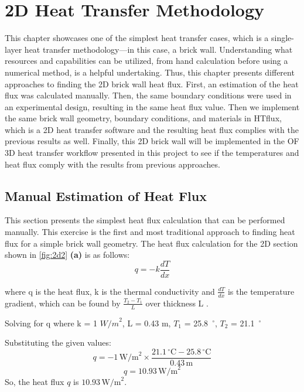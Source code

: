 
\chapter{2D Heat Transfer Methodology}

This chapter showcases one of the simplest heat transfer cases, which is a single-layer heat transfer methodology---in this case, a brick wall.
Understanding what resources and capabilities can be utilized, from hand calculation before using a numerical method, is a helpful undertaking. 
Thus, this chapter presents different approaches to finding the 2D brick wall heat flux. First, an estimation of the heat flux was calculated manually. Then, the same boundary conditions were used in an experimental design, resulting in the same heat flux value. Then we implement the same brick wall geometry, boundary conditions, and materials in HTflux, which is a 2D heat transfer software and the resulting heat flux complies with the previous results as well. %
Finally, this 2D brick wall will be implemented in the \gls{OF} 3D heat transfer workflow presented in this project to see if the temperatures and heat flux comply with the results from previous approaches. 




\section{Manual Estimation of Heat Flux}
This section presents the simplest heat flux calculation that can be performed manually. This exercise is the first and most traditional approach to finding heat flux for a simple brick wall geometry. The heat flux calculation for the 2D section shown in \ref{fig:2d2} \textbf{(a)} is as follows:
\begin{equation}
q = -k \frac{dT}{dx}
\end{equation}

where q is the heat flux,
k is the thermal conductivity and
$\frac{dT}{dx}$ is the temperature gradient, which can be found by $\frac{T_2 - T_1}{L}$ over thickness L \cite{heattransfund}. 

Solving for q where k = 1 ${W/m}^2$, 
L = 0.43 m,
$T_1$ = 25.8\, $^\circ$, 
$T_2$  = 21.1\, $^\circ$



Substituting the given values:
\[ q = -1 \, \text{W/m}^2 \times \frac{21.1 \, ^\circ \text{C} - 25.8 \, ^\circ \text{C}}{0.43 \, \text{m}} \]
\[ q = 10.93 \, \text{W/m}^2 \]
So, the heat flux \( q \) is \( 10.93 \, \text{W/m}^2 \).





